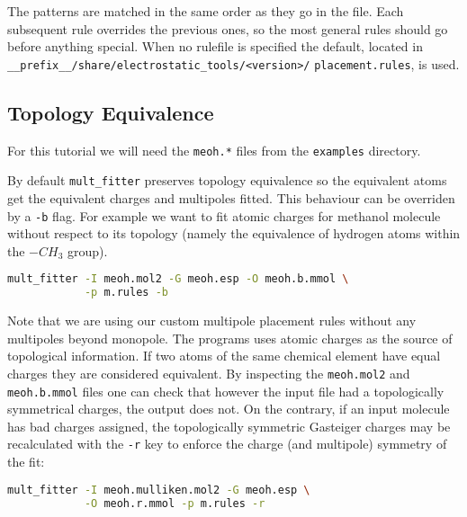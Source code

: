 \documentclass[10pt,a4paper]{article}
\begin{document}
The patterns are
matched in the same order as they go in the file. Each subsequent rule overrides
the previous ones, so the most general rules should go before anything special. When no
rulefile is specified the default, located in
\lstinline{__prefix__/share/}\lstinline{electrostatic_tools/}\lstinline{<version>/}
\lstinline{placement.rules},
is used.
\subsection{Topology Equivalence}
For this tutorial we will need the \lstinline{meoh.*} files from the \lstinline{examples}
directory.

By default \lstinline{mult_fitter} preserves topology equivalence so the equivalent atoms
get the equivalent charges and multipoles fitted. This behaviour can be overriden by a
\lstinline{-b} flag. For example we want to fit atomic charges for methanol molecule 
without respect to its
topology (namely the equivalence of hydrogen atoms within the $-CH_{3}$ group).
\begin{lstlisting}[language=bash]
mult_fitter -I meoh.mol2 -G meoh.esp -O meoh.b.mmol \
            -p m.rules -b
\end{lstlisting}
Note that we are using our custom multipole placement rules without any multipoles 
beyond monopole. The programs uses atomic charges as the source of topological information. 
If two atoms of the same chemical element have equal charges they are considered 
equivalent. 
By inspecting the \lstinline{meoh.mol2} and \lstinline{meoh.b.mmol} files one can check that
however the input file had a topologically symmetrical charges, the output does not.
On the contrary, if an input molecule has bad charges assigned, the topologically symmetric
Gasteiger charges may be recalculated with the \lstinline{-r} key to enforce the charge 
(and multipole) symmetry of the fit:
\begin{lstlisting}[language=bash]
mult_fitter -I meoh.mulliken.mol2 -G meoh.esp \
            -O meoh.r.mmol -p m.rules -r
\end{lstlisting}
\end{document}
